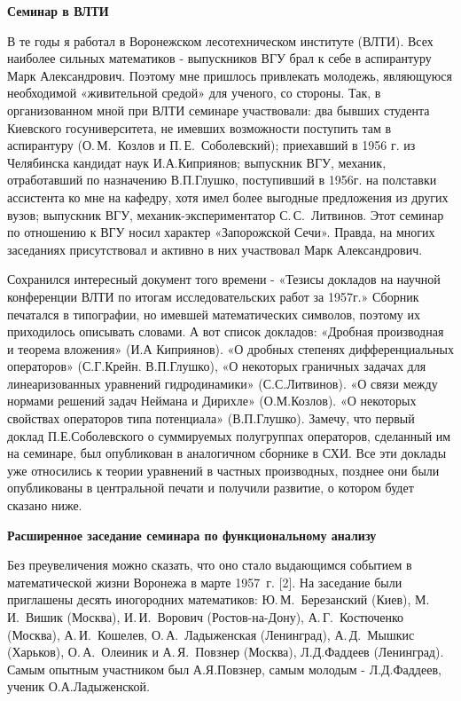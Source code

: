 {\bf Семинар в ВЛТИ}

В те годы я работал в Воронежском лесотехническом институте (ВЛТИ).
Всех наиболее сильных математиков - выпускников ВГУ брал к себе в аспирантуру Марк Александрович.
Поэтому мне пришлось привлекать молодежь, являющуюся необходимой «живительной средой» для ученого, со стороны.
Так, в организованном мной при ВЛТИ семинаре участвовали:
два бывших студента Киевского госуниверситета, не имевших возможности поступить там в аспирантуру
(О.\,М.~Козлов и П.\,Е.~Соболевский); приехавший в 1956 г. из Челябинска кандидат наук И.А.Киприянов;
выпускник ВГУ, механик, отработавший по назначению В.П.Глушко, поступивший в 1956г. на полставки ассистента ко мне на кафедру,
хотя имел более выгодные предложения из других вузов; выпускник ВГУ, механик-экспериментатор С.\,С.~Литвинов. Этот семинар по отношению к ВГУ носил характер «Запорожской Сечи». Правда, на многих заседаниях присутствовал и активно в них участвовал Марк Александрович.

Сохранился интересный документ того времени - «Тезисы докладов на научной конференции ВЛТИ по итогам исследовательских работ за 1957г.» Сборник печатался в типографии, но имевшей математических символов, поэтому их приходилось описывать словами. А вот список докладов: «Дробная производная и теорема вложения» (И.А Киприянов). «О дробных степенях дифференциальных операторов» (С.Г.Крейн. В.П.Глушко), «О некоторых граничных задачах для линеаризованных уравнений гидродинамики» (С.С.Литвинов). «О связи между нормами решений задач Неймана и Дирихле» (О.М.Козлов). «О некоторых свойствах операторов типа потенциала» (В.П.Глушко). Замечу, что первый доклад П.Е.Соболевского о суммируемых полугруппах операторов, сделанный им на семинаре, был опубликован в аналогичном сборнике в СХИ. Все эти доклады уже относились к теории уравнений в частных производных, позднее они были опубликованы в центральной печати и получили развитие, о котором будет сказано ниже.

{\bf Расширенное заседание семинара по фу\-н\-к\-ци\-о\-на\-ль\-но\-му анализу}

Без преувеличения можно сказать, что оно стало выдающимся событием в математической жизни Воронежа в марте 1957~г. [2].
На заседание были приглашены десять иногородних математиков:
Ю.\,М.~Березанский (Киев),
М.\,И.~Ви\-шик (Москва), И.\,И.~Ворович (Ростов-на-Дону), А.\,Г.~Костюченко (Москва), А.\,И.~Кошелев,
О.\,А.~Ладыженская (Ленинград), А.\,Д.~Мышкис (Харьков), О.\,А.~Олеиник и
\linebreak
А.\,Я.~По\-в\-з\-нер (Москва),
Л.Д.Фаддеев (Ленинград).
Самым опытным участником был А.Я.Повзнер, самым молодым - Л.Д.Фаддеев, ученик О.А.Ладыженской.

